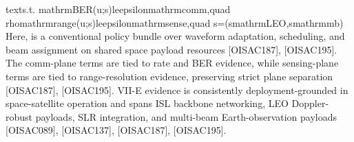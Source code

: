 {}\markdownRendererBackslash{}text\markdownRendererLeftBrace{}s.t. \markdownRendererRightBrace{} \markdownRendererBackslash{}mathrm\markdownRendererLeftBrace{}BER\markdownRendererRightBrace{}(u;s)\markdownRendererBackslash{}le\markdownRendererBackslash{}epsilon\markdownRendererUnderscore{}\markdownRendererLeftBrace{}\markdownRendererBackslash{}mathrm\markdownRendererLeftBrace{}comm\markdownRendererRightBrace{}\markdownRendererRightBrace{},\markdownRendererBackslash{}quad \markdownRendererBackslash{}rho\markdownRendererUnderscore{}\markdownRendererLeftBrace{}\markdownRendererBackslash{}mathrm\markdownRendererLeftBrace{}range\markdownRendererRightBrace{}\markdownRendererRightBrace{}(u;s)\markdownRendererBackslash{}le\markdownRendererBackslash{}epsilon\markdownRendererUnderscore{}\markdownRendererLeftBrace{}\markdownRendererBackslash{}mathrm\markdownRendererLeftBrace{}sense\markdownRendererRightBrace{}\markdownRendererRightBrace{},\markdownRendererBackslash{}quad s=(s\markdownRendererUnderscore{}\markdownRendererLeftBrace{}\markdownRendererBackslash{}mathrm\markdownRendererLeftBrace{}LEO\markdownRendererRightBrace{}\markdownRendererRightBrace{},s\markdownRendererUnderscore{}\markdownRendererLeftBrace{}\markdownRendererBackslash{}mathrm\markdownRendererLeftBrace{}mb\markdownRendererRightBrace{}\markdownRendererRightBrace{})\markdownRendererSoftLineBreak
{}\markdownRendererDollarSign{}\markdownRendererDollarSign{}\markdownRendererParagraphSeparator
{}Here,  is a conventional policy bundle over waveform adaptation, scheduling, and beam assignment on shared space payload resources [O\markdownRendererUnderscore{}ISAC\markdownRendererUnderscore{}187], [O\markdownRendererUnderscore{}ISAC\markdownRendererUnderscore{}195]. The comm-plane terms are tied to rate and BER evidence, while sensing-plane terms are tied to range-resolution evidence, preserving strict plane separation [O\markdownRendererUnderscore{}ISAC\markdownRendererUnderscore{}187], [O\markdownRendererUnderscore{}ISAC\markdownRendererUnderscore{}195].\markdownRendererParagraphSeparator
{}\markdownRendererInterblockSeparator
{}\markdownRendererUlBeginTight
\markdownRendererUlItem VII-E evidence is consistently deployment-grounded in space-satellite operation and spans ISL backbone networking, LEO Doppler-robust payloads, SLR integration, and multi-beam Earth-observation payloads [O\markdownRendererUnderscore{}ISAC\markdownRendererUnderscore{}089], [O\markdownRendererUnderscore{}ISAC\markdownRendererUnderscore{}137], [O\markdownRendererUnderscore{}ISAC\markdownRendererUnderscore{}187], [O\markdownRendererUnderscore{}ISAC\markdownRendererUnderscore{}195].\markdownRendererUlItemEnd 
